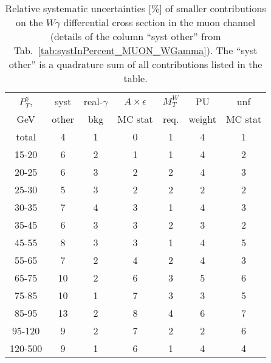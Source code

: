 \begin{table}[h]
  \scriptsize
  \begin{center}
  \caption{Relative systematic uncertainties [\%] of smaller contributions  on the $W\gamma$ differential cross section in the muon channel (details of the column ``syst other'' from Tab.~\ref{tab:systInPercent_MUON_WGamma}). The ``syst other'' is a quadrature sum of all contributions listed in the table.}
  \begin{tabular}{|c|c|c|c|c|c|c|}
    \hline
    $P_T^{\gamma}$,  & syst  & real-$\gamma$ & $A\times\epsilon$ & $M_T^W$ & PU    & unf      \\
    GeV            & other & bkg           & MC stat           & req.   & weight & MC stat \\ \hline
    total  & 4 & 1 & 0 & 1 & 4 & 1 \\ \hline
    15-20 & 6 & 2 & 1 & 1 & 4 & 2 \\ \hline
    20-25 & 6 & 3 & 2 & 2 & 4 & 3 \\ \hline
    25-30 & 5 & 3 & 2 & 2 & 2 & 2 \\ \hline
    30-35 & 7 & 4 & 3 & 1 & 4 & 3 \\ \hline
    35-45 & 6 & 3 & 3 & 2 & 3 & 2 \\ \hline
    45-55 & 8 & 3 & 3 & 1 & 4 & 5 \\ \hline
    55-65 & 7 & 2 & 4 & 2 & 4 & 3 \\ \hline
    65-75 & 10 & 2 & 6 & 3 & 5 & 6 \\ \hline
    75-85 & 10 & 1 & 7 & 3 & 3 & 5 \\ \hline
    85-95 & 13 & 2 & 8 & 4 & 6 & 7 \\ \hline
    95-120 & 9 & 2 & 7 & 2 & 2 & 6 \\ \hline
    120-500 & 9 & 1 & 6 & 1 & 4 & 4 \\ \hline
  \end{tabular}
  \label{tab:systInPercentSmallSysts_MUON_WGamma}
  \end{center}
\end{table}

